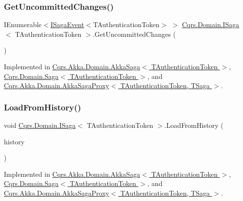 \subsubsection{\texorpdfstring{Get\+Uncommitted\+Changes()}{GetUncommittedChanges()}}
{\footnotesize\ttfamily I\+Enumerable$<$\hyperlink{interfaceCqrs_1_1Events_1_1ISagaEvent}{I\+Saga\+Event}$<$T\+Authentication\+Token$>$ $>$ \hyperlink{interfaceCqrs_1_1Domain_1_1ISaga}{Cqrs.\+Domain.\+I\+Saga}$<$ T\+Authentication\+Token $>$.Get\+Uncommitted\+Changes (\begin{DoxyParamCaption}{ }\end{DoxyParamCaption})}



Implemented in \hyperlink{classCqrs_1_1Akka_1_1Domain_1_1AkkaSaga_ac88061e29e3e2223db31ce9075835b46}{Cqrs.\+Akka.\+Domain.\+Akka\+Saga$<$ T\+Authentication\+Token $>$}, \hyperlink{classCqrs_1_1Domain_1_1Saga_a043e8e21e7550c34f5848af7a87e33cd}{Cqrs.\+Domain.\+Saga$<$ T\+Authentication\+Token $>$}, and \hyperlink{classCqrs_1_1Akka_1_1Domain_1_1AkkaSagaProxy_a8cad3415bc5474a01bfdb2db3a852ea5}{Cqrs.\+Akka.\+Domain.\+Akka\+Saga\+Proxy$<$ T\+Authentication\+Token, T\+Saga $>$}.

\mbox{\label{interfaceCqrs_1_1Domain_1_1ISaga_a2714804684bc65cf4dec79b4697b9b21}} 
\subsubsection{\texorpdfstring{Load\+From\+History()}{LoadFromHistory()}}
{\footnotesize\ttfamily void \hyperlink{interfaceCqrs_1_1Domain_1_1ISaga}{Cqrs.\+Domain.\+I\+Saga}$<$ T\+Authentication\+Token $>$.Load\+From\+History (\begin{DoxyParamCaption}\item[{I\+Enumerable$<$ \hyperlink{interfaceCqrs_1_1Events_1_1ISagaEvent}{I\+Saga\+Event}$<$ T\+Authentication\+Token $>$$>$}]{history }\end{DoxyParamCaption})}



Implemented in \hyperlink{classCqrs_1_1Akka_1_1Domain_1_1AkkaSaga_a40b859bc15c2f7c87a21b07f9bc9548c}{Cqrs.\+Akka.\+Domain.\+Akka\+Saga$<$ T\+Authentication\+Token $>$}, \hyperlink{classCqrs_1_1Domain_1_1Saga_a6029fc09445e2093f7fb40e304a04ff8}{Cqrs.\+Domain.\+Saga$<$ T\+Authentication\+Token $>$}, and \hyperlink{classCqrs_1_1Akka_1_1Domain_1_1AkkaSagaProxy_a21b69799b046c1fcdf5b2443699dee0c}{Cqrs.\+Akka.\+Domain.\+Akka\+Saga\+Proxy$<$ T\+Authentication\+Token, T\+Saga $>$}.

